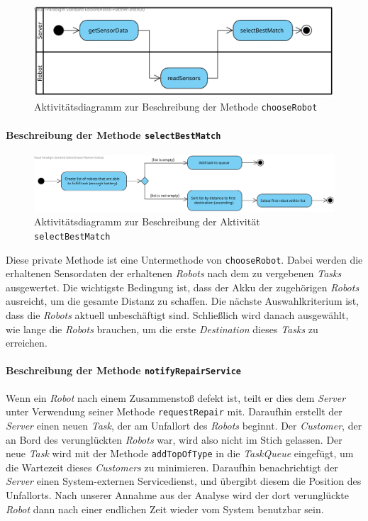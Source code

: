 			\begin{figure}[H]
			\centering
			\includegraphics[width=1\textwidth]{img/1-Analyse-3-Choose_Robot}
			\caption{Aktivitätsdiagramm zur Beschreibung der Methode \texttt{chooseRobot}}
			\label{ChooseRobotActivity}
			\end{figure}			
			
			\paragraph{Beschreibung der Methode \texttt{selectBestMatch}}
			\begin{figure}[H]
			\centering
			\includegraphics[width=1\textwidth]{img/2-Entwurf-SelectBestMatch}
			\caption{Aktivitätsdiagramm zur Beschreibung der Aktivität \texttt{selectBestMatch}}
			\label{SelectBestMatchActivity}
			\end{figure}
			Diese private Methode ist eine Untermethode von \texttt{chooseRobot}. Dabei werden die erhaltenen Sensordaten der erhaltenen \textit{Robots} nach dem zu vergebenen \textit{Tasks} ausgewertet. Die wichtigste Bedingung ist, dass der Akku der zugehörigen \textit{Robots} ausreicht, um die gesamte Distanz zu schaffen. Die nächste Auswahlkriterium ist, dass die \textit{Robots} aktuell unbeschäftigt sind. Schließlich wird danach ausgewählt, wie lange die \textit{Robots} brauchen, um die erste \textit{Destination} dieses \textit{Tasks} zu erreichen.

			\paragraph{Beschreibung der Methode \texttt{notifyRepairService}}
			Wenn ein \textit{Robot} nach einem Zusammenstoß defekt ist, teilt er dies dem \textit{Server} unter Verwendung seiner Methode \texttt{requestRepair} mit.	Daraufhin erstellt der \textit{Server} einen neuen  \textit{Task}, der am Unfallort des \textit{Robots} beginnt. Der \textit{Customer}, der an Bord des verunglückten \textit{Robots} war, wird also nicht im Stich gelassen. Der neue \textit{Task} wird mit der Methode \texttt{addTopOfType} in die \textit{TaskQueue} eingefügt, um die Wartezeit dieses \textit{Customers} zu minimieren. Daraufhin benachrichtigt der \textit{Server} einen System-externen Servicedienst, und übergibt diesem die Position des Unfallorts. Nach unserer Annahme aus der Analyse wird der dort verunglückte \textit{Robot} dann nach einer endlichen Zeit wieder vom System benutzbar sein.
			
